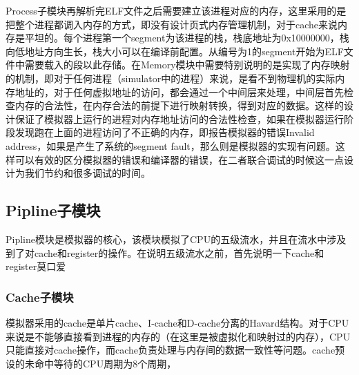 \documentclass[12pt,a4paper]{article}
\begin{document}
Process子模块再解析完ELF文件之后需要建立该进程对应的内存，这里采用的是把整个进程都调入内存的方式，即没有设计页式内存管理机制，对于cache来说内存是平坦的。每个进程第一个segment为该进程的栈，栈底地址为0x10000000，栈向低地址方向生长，栈大小可以在编译前配置。从编号为1的segment开始为ELF文件中需要载入的段以此存储。在Memory模块中需要特别说明的是实现了内存映射的机制，即对于任何进程（simulator中的进程）来说，是看不到物理机的实际内存地址的，对于任何虚拟地址的访问，都会通过一个中间层来处理，中间层首先检查内存的合法性，在内存合法的前提下进行映射转换，得到对应的数据。这样的设计保证了模拟器上运行的进程对内存地址访问的合法性检查，如果在模拟器运行阶段发现跑在上面的进程访问了不正确的内存，即报告模拟器的错误Invalid address，如果是产生了系统的segment fault，那么则是模拟器的实现有问题。这样可以有效的区分模拟器的错误和编译器的错误，在二者联合调试的时候这一点设计为我们节约和很多调试的时间。

\subsection{Pipline子模块}
Pipline模块是模拟器的核心，该模块模拟了CPU的五级流水，并且在流水中涉及到了对cache和register的操作。在说明五级流水之前，首先说明一下cache和register莫口爱

\subsubsection{Cache子模块}
模拟器采用的cache是单片cache、I-cache和D-cache分离的Havard结构。对于CPU来说是不能够直接看到进程的内存的（在这里是被虚拟化和映射过的内存），CPU只能直接对cache操作，而cache负责处理与内存间的数据一致性等问题。cache预设的未命中等待的CPU周期为8个周期，
\end{document}
